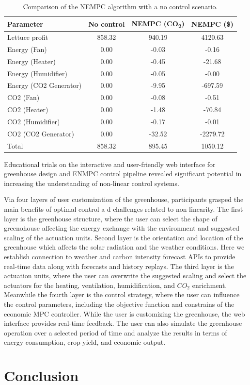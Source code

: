 \documentclass[conference]{IEEEtran}
\begin{document}
\begin{table}
    \centering
    \caption{Comparison of the NEMPC algorithm with a no control scenario.}\label{tab:comparison}
    \begin{tabular}{lS[table-format=4.2]S[table-format=4.2]S[table-format=4.2]}
        \toprule
        Parameter & {No control} & {NEMPC (CO\textsubscript{2})} & {NEMPC (\$)} \\
        \midrule
        Lettuce profit & 858.32 & 940.19 & 4120.63 \\
        Energy (Fan) & 0.00 & -0.03 & -0.16 \\
        Energy (Heater) & 0.00 & -0.45 & -21.68 \\
        Energy (Humidifier) & 0.00 & -0.05 & -0.00 \\
        Energy (CO2 Generator) & 0.00 & -9.95 & -697.59 \\
        CO2 (Fan) & 0.00 & -0.08 & -0.51 \\
        CO2 (Heater) & 0.00 & -1.48 & -70.84 \\
        CO2 (Humidifier) & 0.00 & -0.17 & -0.01 \\
        CO2 (CO2 Generator) & 0.00 & -32.52 & -2279.72 \\
        \midrule
        Total & 858.32 & 895.45 & 1050.12 \\
        \bottomrule
    \end{tabular}
\end{table}

Educational trials on the interactive and user-friendly web interface for greenhouse design and ENMPC control pipeline revealed significant potential in increasing the understanding of non-linear control systems. 

Via four layers of user customization of the greenhouse, participants grasped the main benefits of optimal control a d challenges related to non-linearity. The first layer is the greenhouse structure, where the user can select the shape of greenohouse affecting the energy exchange with the environment and suggested scaling of the actuation units. Second layer is the orientation and location of the greenhouse which affects the solar radiation and the weather conditions. Here we establish connection to weather and carbon intensity forecast APIs to provide real-time data along with forecasts and history replays. The third layer is the actuation units, where the user can overwrite the suggested scaling and select the actuators for the heating, ventilation, humidification, and \(CO_2\) enrichment. Meanwhile the fourth layer is the control strategy, where the user can influence the control parameters, including the objective function and constrains of the economic MPC controller. While the user is customizing the greenhouse, the web interface provides real-time feedback. The user can also simulate the greenhouse operation over a selected period of time and analyze the results in terms of energy consumption, crop yield, and economic output.

\section{Conclusion}



\end{document}
